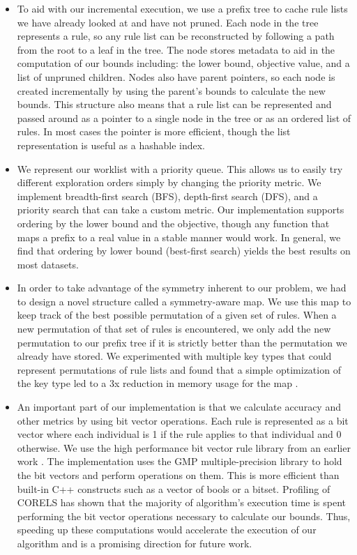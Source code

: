 \documentclass[format=sigconf]{acmart}
\begin{document}
\begin{itemize}[leftmargin=*, itemsep=0.8\baselineskip]
\item To aid with our incremental execution, we use a prefix tree to cache rule lists we have already looked at and have not pruned.
Each node in the tree represents a rule, so any rule list can be reconstructed by following a path from the root to a leaf in the tree.
The node stores metadata to aid in the computation of our bounds including: the lower bound, objective value, and a list of unpruned children.
Nodes also have parent pointers, so each node is created incrementally by using the parent's bounds to calculate the new bounds.
This structure also means that a rule list can be represented and passed around as a pointer to a single node in the tree or as an ordered list of rules.
In most cases the pointer is more efficient, though the list representation is useful as a hashable index.

\item We represent our worklist with a priority queue.
This allows us to easily try different exploration orders simply by changing the priority metric.
We implement breadth-first search (BFS), depth-first search (DFS), and a priority search that can take a custom metric.
Our implementation supports ordering by the lower bound and the objective, though any function that maps a prefix to a real value in a stable manner would work.
In general, we find that ordering by lower bound (best-first search) yields the best results on most datasets.

\item In order to take advantage of the symmetry inherent to our problem, we had to design a novel structure called a symmetry-aware map.
We use this map to keep track of the best possible permutation of a given set of rules.
When a new permutation of that set of rules is encountered, we only add the new permutation to our prefix tree if it is strictly better than the permutation we already have stored.
We experimented with multiple key types that could represent permutations of rule lists and found that a simple optimization of the key type led to a 3x reduction in memory usage for the map \cite{Larus-Stone17}.

\item An important part of our implementation is that we calculate accuracy and other metrics by using bit vector operations.
Each rule is represented as a bit vector where each individual is 1 if the rule applies to that individual and 0 otherwise.
We use the high performance bit vector rule library from an earlier work \cite{YangRuSe16}.
The implementation uses the GMP multiple-precision library to hold the bit vectors and perform operations on them.
This is more efficient than built-in C++ constructs such as a vector of bools or a bitset.
Profiling of CORELS has shown that the majority of algorithm's execution time is spent performing the bit vector operations necessary to calculate our bounds.
Thus, speeding up these computations would accelerate the execution of our algorithm and is a promising direction for future work.
\end{itemize}
\vspace{0.5\baselineskip}
\end{document}
